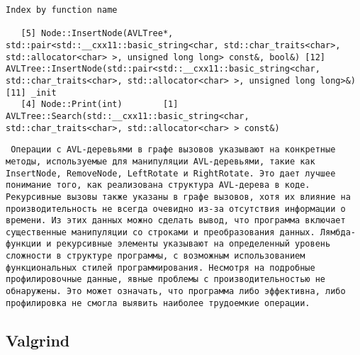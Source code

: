 \documentclass[12pt]{article}
\begin{document}
\begin{lstlisting}
Index by function name

   [5] Node::InsertNode(AVLTree*, std::pair<std::__cxx11::basic_string<char, std::char_traits<char>, std::allocator<char> >, unsigned long long> const&, bool&) [12] AVLTree::InsertNode(std::pair<std::__cxx11::basic_string<char, std::char_traits<char>, std::allocator<char> >, unsigned long long>&) [11] _init
   [4] Node::Print(int)        [1] AVLTree::Search(std::__cxx11::basic_string<char, std::char_traits<char>, std::allocator<char> > const&)

\end{lstlisting}
\texttt{
Операции с AVL-деревьями в графе вызовов указывают на конкретные методы, используемые для манипуляции AVL-деревьями, такие как InsertNode, RemoveNode, LeftRotate и RightRotate. Это дает лучшее понимание того, как реализована структура AVL-дерева в коде. Рекурсивные вызовы также указаны в графе вызовов, хотя их влияние на производительность не всегда очевидно из-за отсутствия информации о времени. Из этих данных можно сделать вывод, что программа включает существенные манипуляции со строками и преобразования данных. Лямбда-функции и рекурсивные элементы указывают на определенный уровень сложности в структуре программы, с возможным использованием функциональных стилей программирования.
Несмотря на подробные профилировочные данные, явные проблемы с производительностью не обнаружены. Это может означать, что программа либо эффективна, либо профилировка не смогла выявить наиболее трудоемкие операции.
}
\subsection*{Valgrind}
\end{document}
